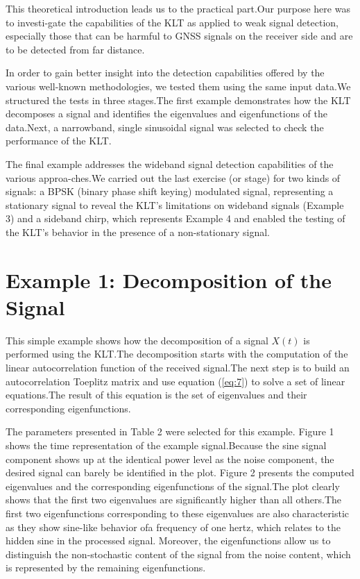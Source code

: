 \documentclass[12pt]{report}
\begin{document}
This theoretical introduction leads us to the practical part.\@ Our purpose here was to investi-gate the capabilities of the KLT as applied to weak signal detection, especially those that can be harmful to GNSS signals on the receiver side and are to be detected from far distance.

In order to gain better insight into the detection capabilities offered by the various well-known methodologies, we tested them using the same input data.\@ We structured the tests in three stages.\@ The first example demonstrates how the KLT decomposes a signal and identifies the eigenvalues and eigenfunctions of the data.\@ Next, a narrowband, single sinusoidal signal was selected to check the performance of the KLT.

The final example addresses the wideband signal detection capabilities of the various approa-ches.\@ We carried out the last exercise (or stage) for two kinds of signals: a BPSK (binary phase shift keying) modulated signal, representing a stationary signal to reveal the KLT's limitations on wideband signals (Example 3) and a  sideband chirp, which represents Example 4 and enabled the testing of the KLT's behavior in the presence of a non-stationary signal.
\section*{Example 1: Decomposition of the Signal}
This simple example shows how the decomposition of a signal $X(t)$ is performed using the KLT.\@ The decomposition starts with the computation of the linear autocorrelation function of the received signal.\@ The next step is to build an autocorrelation Toeplitz matrix and use equation (\ref{eq:7}) to solve a set of linear equations.\@ The result of this equation is the set of eigenvalues and their corresponding eigenfunctions.

The parameters presented in Table 2 were selected for this example.
Figure 1 shows the time representation of the example signal.\@ Because the sine signal component shows up at the identical power level as the noise component, the desired signal can barely be identified in the plot.
Figure 2 presents the computed eigenvalues and the corresponding eigenfunctions of the signal.\@ The plot clearly shows that the first two eigenvalues are significantly higher than all others.\@ The first two eigenfunctions corresponding to these eigenvalues are also characteristic as they show sine-like behavior ofa frequency of one hertz, which relates to the hidden sine in the processed signal.
Moreover, the eigenfunctions allow us to distinguish the non-stochastic content of the signal from the noise content, which is represented by the remaining eigenfunctions.
\end{document}
